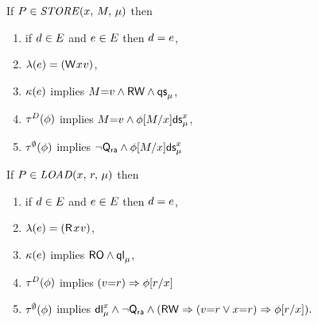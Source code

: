 \noindent
If $\aPS \in \sSTORE[\amode]{\aLoc}{\aExp}$ then
\begin{enumerate}
\item if $\bEv\in\aEvs$ and $\aEv\in\aEvs$ then $\bEv=\aEv$,
\item $\labelingAct(\aEv) = \DWP{\aLoc}{\aVal}$,
\item 
  $\labelingForm(\aEv)$ implies
  \begin{math}
    \aExp{=}\aVal
    \land \RW
    \land \QS{}{\amode}
  \end{math},
\item
  $\aTr[\bEvs](\aForm)$ implies 
  \begin{math}
    \aExp{=}\aVal
    \land \DS{\aLoc}{\amode}{\aForm[\aExp/{\aLoc}]}
  \end{math},
\item 
  $\aTr[\emptyset](\aForm)$ implies 
  \begin{math}
    \lnot\Q{\mRA}
    \land \DS{\aLoc}{\amode}{\aForm[\aExp/{\aLoc}]}
  \end{math}
\end{enumerate}

\noindent
If $\aPS \in \sLOAD[\amode]{\aLoc}{\aReg}$ then
\begin{enumerate}
\item if $\bEv\in\aEvs$ and $\aEv\in\aEvs$ then $\bEv=\aEv$,
\item $\labelingAct(\aEv) = \DRP{\aLoc}{\aVal}$,
\item $\labelingForm(\aEv)$ implies
  \begin{math}
    \RO
    \land \QL{}{\amode}
  \end{math},
\item
  $\aTr[\bEvs](\aForm)$ implies
  \begin{math}
    (\aVal{=}\aReg)
    \limplies \aForm[\aReg/{\aLoc}]
  \end{math}
\item 
  $\aTr[\emptyset](\aForm)$ implies
  \begin{math}
    \DL{\aLoc}{\amode}
    \land \lnot\Q{\mRA}
    \land
    (\RW
    \limplies (\aVal{=}\aReg\lor\aLoc{=}\aReg) 
    \limplies \aForm[\aReg/{\aLoc}]
    ).
  \end{math}
\end{enumerate}  
